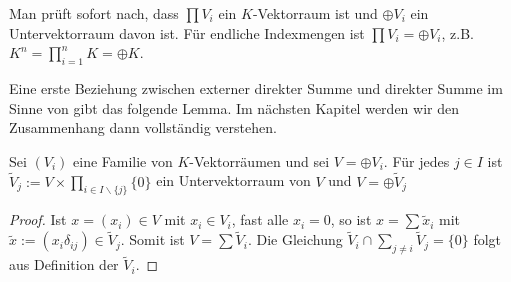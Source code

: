 \begin{remark}
	Man prüft sofort nach, dass $\prod V_i$ ein $K$-Vektorraum ist und $\oplus V_i$ ein Untervektorraum davon ist. Für 
	endliche Indexmengen ist $\prod V_i = \oplus V_i$, z.B. $K^n = \prod_{i=1}^n K = \oplus K$.
	
	Eine erste Beziehung zwischen externer direkter Summe und direkter Summe im Sinne von  gibt das folgende Lemma. Im nächsten Kapitel werden wir den Zusammenhang dann vollständig verstehen.
\end{remark}

\begin{lemma}
	Sei $(V_i)$ eine Familie von $K$-Vektorräumen und sei $V=\oplus V_i$. Für jedes $j\in I$ ist $\tilde V_j :=
	V \times \prod_{i\in I\backslash\{j\}} \{0\}$ ein Untervektorraum von $V$ und $V=\oplus \tilde V_j$
\end{lemma}
\begin{proof}
	Ist $x=(x_i)\in V$ mit $x_i\in V_i$, fast alle $x_i=0$, so ist $x=\sum \tilde x_i$ mit $\tilde x:=(x_i\delta_{ij})
	\in \tilde V_j$. Somit ist $V=\sum \tilde V_i$. Die Gleichung $\tilde V_i \cap \sum_{j\neq i} \tilde V_j 
	=\{0\}$ folgt aus Definition der $\tilde V_i.$
\end{proof}